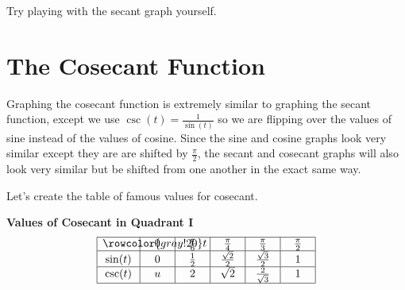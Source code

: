 \documentclass[nooutcomes, noauthor]{ximera}
\begin{document}
Try playing with the secant graph yourself.

\begin{center}  
\end{center} 


\section{The Cosecant Function}

Graphing the cosecant function is extremely similar to graphing the secant function, except we use $\csc(t)=\frac{1}{\sin(t)}$ so we are flipping over the values of sine instead of the values of cosine.  Since the sine and cosine graphs look very similar except they are are shifted by $\frac{\pi}{2}$, the secant and cosecant graphs will also look very similar but be shifted from one another in the exact same way.  

Let's create the table of famous values for cosecant.

\begin{center}
\textbf{Values of Cosecant in Quadrant I}
\renewcommand*{\arraystretch}{2.5}
\setlength{\arrayrulewidth}{0.5mm}
\setlength{\tabcolsep}{18pt}
\[
\begin{array}{|>{\centering\arraybackslash$} p{1cm} <{$} | >{\centering\arraybackslash$} p{.75cm} <{$} |  >{\centering\arraybackslash$} p{.75cm} <{$} |  >{\centering\arraybackslash$} p{.75cm} <{$} |  >{\centering\arraybackslash$} p{.75cm} <{$} |  >{\centering\arraybackslash$} p{.75cm} <{$} |}
\hline 
\rowcolor{gray!20}
t & 0 & \frac{\pi}{6} & \frac{\pi}{4} & \frac{\pi}{3} & \frac{\pi}{2}\\
\hline
\sin(t) & 0 & \frac{1}{2} &\frac{\sqrt{2}}{2} & \frac{\sqrt{3}}{2} & 1\\
\hline
\csc(t) & u & 2& \sqrt{2} & \frac{2}{\sqrt{3}}& 1\\
\hline 
\end{array}
\]
\end{center}
\end{document}
